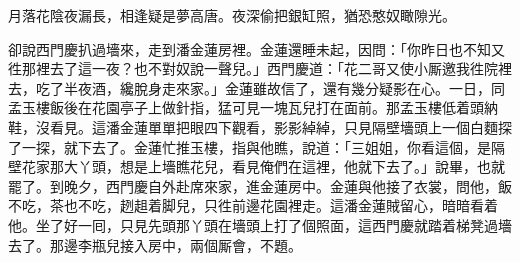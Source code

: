 月落花陰夜漏長，相逢疑是夢高唐。夜深偷把銀缸照，猶恐憨奴瞰隙光。

卻說西門慶扒過墻來，走到潘金蓮房裡。金蓮還睡未起，因問：「你昨日也不知又徃那裡去了這一夜？也不對奴說一聲兒。」西門慶道：「花二哥又使小厮邀我徃院裡去，吃了半夜酒，纔脫身走來家。」金蓮雖故信了，還有幾分疑影在心。一日，同孟玉樓飯後在花園亭子上做針指，猛可見一塊瓦兒打在面前。那孟玉樓低着頭納鞋，沒看見。這潘金蓮單單把眼四下觀看，影影綽綽，只見隔壁墻頭上一個白麵探了一探，就下去了。金蓮忙推玉樓，指與他瞧，說道：「三姐姐，你看這個，是隔壁花家那大丫頭，想是上墻瞧花兒，看見俺們在這裡，他就下去了。」說畢，也就罷了。到晚夕，西門慶自外赴席來家，進金蓮房中。金蓮與他接了衣裳，問他，飯不吃，茶也不吃，趔趄着脚兒，只徃前邊花園裡走。{}這潘金蓮賊留心，暗暗看着他。坐了好一囘，只見先頭那丫頭在墻頭上打了個照面，這西門慶就踏着梯凳過墻去了。那邊李瓶兒接入房中，兩個厮會，不題。

